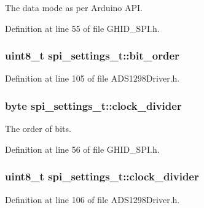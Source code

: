 \-The data mode as per \-Arduino \-A\-P\-I. 



\-Definition at line 55 of file \-G\-H\-I\-D\-\_\-\-S\-P\-I.\-h.

\hypertarget{structspi__settings__t_a51403976cb27fc790da821f19c3805c1}{
\subsubsection[{bit\-\_\-order}]{\setlength{\rightskip}{0pt plus 5cm}uint8\-\_\-t {\bf spi\-\_\-settings\-\_\-t\-::bit\-\_\-order}}}\label{structspi__settings__t_a51403976cb27fc790da821f19c3805c1}


\-Definition at line 105 of file \-A\-D\-S1298\-Driver.\-h.

\hypertarget{structspi__settings__t_a3f4596147a36610d8173f4d8d9655a0b}{
\subsubsection[{clock\-\_\-divider}]{\setlength{\rightskip}{0pt plus 5cm}byte {\bf spi\-\_\-settings\-\_\-t\-::clock\-\_\-divider}}}\label{structspi__settings__t_a3f4596147a36610d8173f4d8d9655a0b}


\-The order of bits. 



\-Definition at line 56 of file \-G\-H\-I\-D\-\_\-\-S\-P\-I.\-h.

\hypertarget{structspi__settings__t_a9875fd618b56150ea4737756d02ba092}{
\subsubsection[{clock\-\_\-divider}]{\setlength{\rightskip}{0pt plus 5cm}uint8\-\_\-t {\bf spi\-\_\-settings\-\_\-t\-::clock\-\_\-divider}}}\label{structspi__settings__t_a9875fd618b56150ea4737756d02ba092}


\-Definition at line 106 of file \-A\-D\-S1298\-Driver.\-h.

